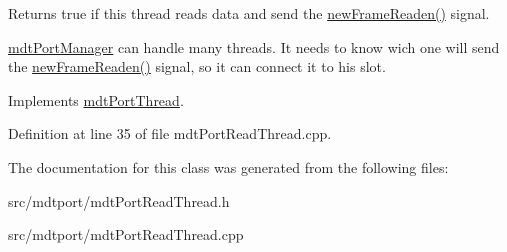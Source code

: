 Returns true if this thread reads data and send the \hyperlink{classmdt_port_thread_a7fc2245c753fd65e1beffec211c41461}{newFrameReaden()} signal. 

\hyperlink{classmdt_port_manager}{mdtPortManager} can handle many threads. It needs to know wich one will send the \hyperlink{classmdt_port_thread_a7fc2245c753fd65e1beffec211c41461}{newFrameReaden()} signal, so it can connect it to his slot. 

Implements \hyperlink{classmdt_port_thread_a3d57f15a864ae45c98eb40dd89f4cec6}{mdtPortThread}.



Definition at line 35 of file mdtPortReadThread.cpp.



The documentation for this class was generated from the following files:\begin{DoxyCompactItemize}
\item 
src/mdtport/mdtPortReadThread.h\item 
src/mdtport/mdtPortReadThread.cpp\end{DoxyCompactItemize}
